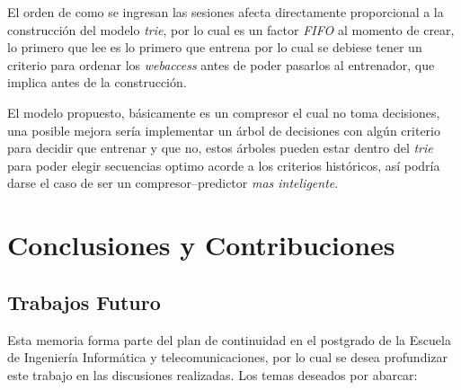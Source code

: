 



 


 


 

El orden de como se ingresan las sesiones afecta directamente proporcional a la construcción del modelo \emph{trie},  por lo cual es un factor  \emph{FIFO} al momento de crear, lo primero que lee es lo primero que entrena por lo cual se debiese tener un criterio para ordenar los \emph{webaccess} antes de poder pasarlos al entrenador, que implica antes de la construcción.

El modelo propuesto, básicamente es un compresor el cual no toma decisiones, una posible mejora sería implementar un árbol de decisiones con algún criterio para decidir que entrenar y que no, estos árboles pueden estar dentro del \emph{trie} para
poder elegir secuencias optimo acorde a los criterios históricos, así podría darse el caso de ser un compresor--predictor  \emph{mas inteligente}.



















\vspace{2cm}
\chapter{Conclusiones y Contribuciones}\label{ch:conlusion-contrib-all}
	






\newpage
\section{Trabajos Futuro}

Esta memoria forma parte del plan de continuidad en el postgrado de la Escuela de Ingeniería Informática y telecomunicaciones, por lo cual se desea profundizar este trabajo en las discusiones realizadas. Los temas deseados por abarcar:

